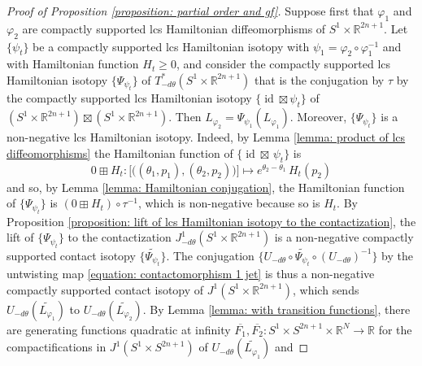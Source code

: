 \documentclass{amsart}
\DeclareMathOperator{\id}{id}
\theoremstyle{remark}
\begin{document}
\begin{proof}[Proof of Proposition \ref{proposition: partial order and gf}]
Suppose first that $\varphi_1$ and $\varphi_2$
are compactly supported lcs Hamiltonian diffeomorphisms
of $S^1 \times \mathbb{R}^{2n+1}$.
Let $\{\psi_t\}$ be a compactly supported lcs Hamiltonian isotopy
with $\psi_1 = \varphi_2 \circ \varphi_1^{-1}$
and with Hamiltonian function $H_t \geq 0$,
and consider the compactly supported
lcs Hamiltonian isotopy $\{ \Psi_{\psi_t} \}$
of $T^{\ast}_{-d\theta} (S^1 \times \mathbb{R}^{2n+1})$
that is the conjugation by $\tau$
by the compactly supported lcs Hamiltonian isotopy $\{ \id \boxtimes \psi_t \}$
of $(S^1 \times \mathbb{R}^{2n+1}) \boxtimes (S^1 \times \mathbb{R}^{2n+1})$.
Then $L_{\varphi_2} = \Psi_{\psi_1} (L_{\varphi_1})$.
Moreover,
$\{\Psi_{\psi_t}\}$ is a non-negative lcs Hamiltonian isotopy.
Indeed, 
by Lemma \ref{lemma: product of lcs diffeomorphisms}
the Hamiltonian function of $\{\id \boxtimes\, \psi_t\}$ is
\[
0 \boxplus H_t: \big[\big( (\theta_1, p_1) , (\theta_2, p_2) \big)\big]
\mapsto e^{\theta_2 - \theta_1} \, H_t (p_2)
\]
and so, by Lemma \ref{lemma: Hamiltonian conjugation},
the Hamiltonian function of $\{\Psi_{\psi_t}\}$
is $(0 \boxplus H_t) \circ \tau^{-1}$,
which is non-negative
because so is $H_t$.
By Proposition \ref{proposition: lift of lcs Hamiltonian isotopy to the contactization},
the lift of $\{\Psi_{\psi_t}\}$ to the contactization
$J^1_{-d\theta} (S^1 \times \mathbb{R}^{2n+1})$
is a non-negative compactly supported contact isotopy $\{\widetilde{\Psi_{\psi_t}}\}$.
The conjugation
$\{ U_{-d\theta} \circ \widetilde{\Psi_{\psi_t}} \circ (U_{-d\theta})^{-1} \}$
by the untwisting map \eqref{equation: contactomorphism 1 jet}
is thus a non-negative compactly supported contact isotopy of $J^1 (S^1 \times \mathbb{R}^{2n+1})$,
which sends $U_{-d\theta} (\widetilde{L_{\varphi_1}})$
to $U_{-d\theta} (\widetilde{L_{\varphi_2}})$.
By Lemma \ref{lemma: with transition functions},
there are generating functions quadratic at infinity
$\overline{F_1}, \overline{F_2}:
S^1 \times S^{2n+1} \times \mathbb{R}^N \rightarrow \mathbb{R}$
for the compactifications in $J^1 (S^1 \times S^{2n+1})$
of $U_{-d\theta} (\widetilde{L_{\varphi_1}})$ and

\end{proof}
\end{document}
